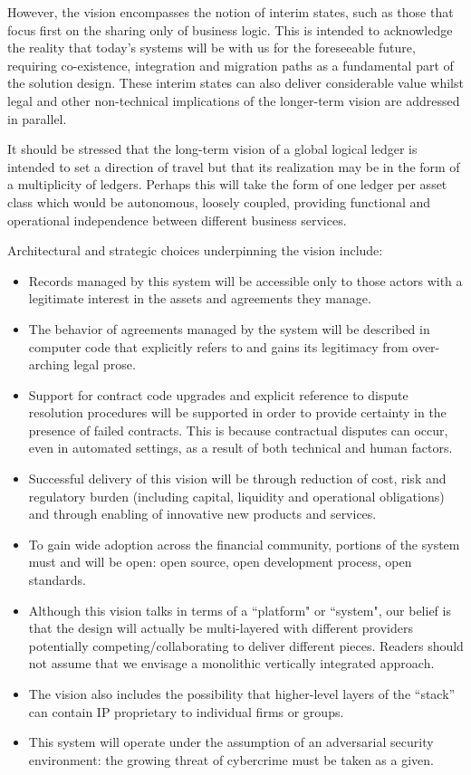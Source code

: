 \documentclass{article}
\begin{document}
However, the vision encompasses the notion of interim states, such as those that focus first on the sharing only of business logic. This is intended to acknowledge the reality that today's systems will be with us for the foreseeable future, requiring co-existence, integration and migration paths as a fundamental part of the solution design. These interim states can also deliver considerable value whilst legal and other non-technical implications of the longer-term vision are addressed in parallel.

It should be stressed that the long-term vision of a global logical ledger is intended to set a direction of travel but that its realization may be in the form of a multiplicity of ledgers. Perhaps this will take the form of one ledger per asset class which would be autonomous, loosely coupled, providing functional and operational independence between different business services. 

Architectural and strategic choices underpinning the vision include:
\begin{itemize} 
\item Records managed by this system will be accessible only to those actors with a legitimate interest in the assets and agreements they manage.
\item The behavior of agreements managed by the system will be described in computer code that explicitly refers to and gains its legitimacy from over-arching legal prose.\cite{Ricardian}
\item Support for contract code upgrades and explicit reference to dispute resolution procedures will be supported in order to provide certainty in the presence of failed contracts. This is because contractual disputes can occur, even in automated settings, as a result of both technical and human factors. 
\item Successful delivery of this vision will be through reduction of cost, risk and regulatory burden (including capital, liquidity and operational obligations) and through enabling of innovative new products and services.
\item To gain wide adoption across the financial community, portions of the system must and will be open: open source, open development process, open standards.
\item Although this vision talks in terms of a ``platform" or ``system", our belief is that the design will actually be multi-layered with different providers potentially competing/collaborating to deliver different pieces. Readers should not assume that we envisage a monolithic vertically integrated approach.
\item The vision also includes the possibility that higher-level layers of the “stack” can contain IP proprietary to individual firms or groups.
\item This system will operate under the assumption of an adversarial security environment: the growing threat of cybercrime must be taken as a given.
\end{itemize}
\end{document}
